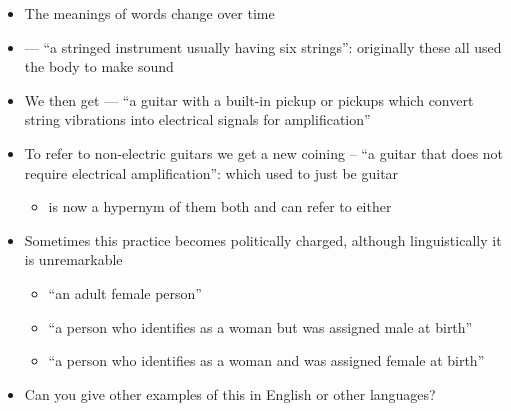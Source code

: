\documentclass[a4paper,landscape,headrule,footrule,xetex]{foils}
\begin{document}
\begin{itemize}\addtolength{\itemsep}{-1ex}
\item The meanings of words change over time
\item {} --- ``a stringed instrument usually having six
  strings'': originally these all used the body to make sound
\item We then get  --- ``a guitar with a built-in
  pickup or pickups which convert string vibrations into electrical
  signals for amplification''
\item To refer to non-electric guitars we get a new coining
   -- ``a guitar that does not require electrical
  amplification'': which used to just be guitar
  \begin{itemize}
  \item {} is now a hypernym of them both and can refer to
    either
  \end{itemize}
\newpage
  
\item Sometimes this practice becomes politically charged, although
  linguistically it is unremarkable
  \begin{itemize}
  \item {} ``an adult female person''
  \item {} ``a person who identifies as a woman but was assigned male at birth''
  \item {}  ``a person who identifies as a woman and was assigned female at birth''
  \end{itemize}
  \item Can you give other examples of this in English or other languages?\task  
  
\end{itemize}

% 

\end{document}
